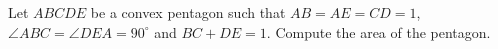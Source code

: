 Let $ABCDE$ be a convex pentagon such that $AB=AE=CD=1$, $\angle ABC=\angle DEA=90^\circ$ and $BC+DE=1$. Compute the area of the pentagon.
